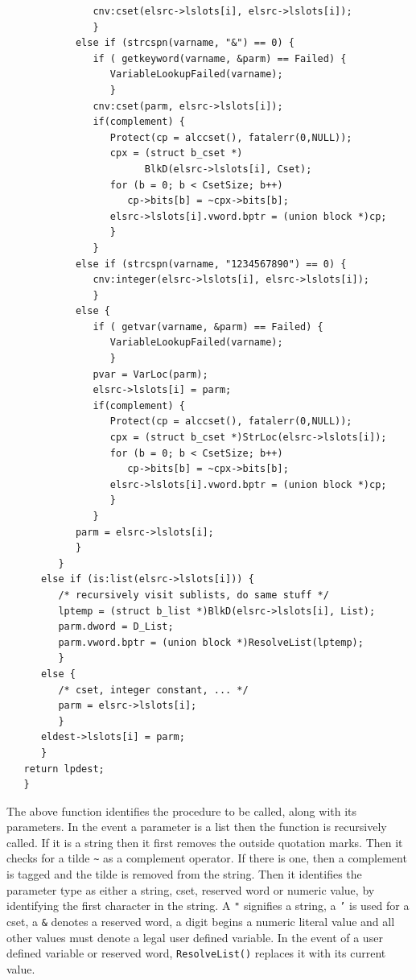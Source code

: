 \documentclass{article}
\begin{document}
\begin{verbatim}
               cnv:cset(elsrc->lslots[i], elsrc->lslots[i]);
               }
            else if (strcspn(varname, "&") == 0) {
               if ( getkeyword(varname, &parm) == Failed) {
                  VariableLookupFailed(varname);
                  }
               cnv:cset(parm, elsrc->lslots[i]);
               if(complement) {
                  Protect(cp = alccset(), fatalerr(0,NULL));
                  cpx = (struct b_cset *)
                        BlkD(elsrc->lslots[i], Cset);
                  for (b = 0; b < CsetSize; b++) 
                     cp->bits[b] = ~cpx->bits[b];
                  elsrc->lslots[i].vword.bptr = (union block *)cp;
                  }
               }
            else if (strcspn(varname, "1234567890") == 0) {
               cnv:integer(elsrc->lslots[i], elsrc->lslots[i]);
               }
            else {
               if ( getvar(varname, &parm) == Failed) {
                  VariableLookupFailed(varname);
                  }
               pvar = VarLoc(parm);
               elsrc->lslots[i] = parm;
               if(complement) {
                  Protect(cp = alccset(), fatalerr(0,NULL));
                  cpx = (struct b_cset *)StrLoc(elsrc->lslots[i]);
                  for (b = 0; b < CsetSize; b++) 
                     cp->bits[b] = ~cpx->bits[b];
                  elsrc->lslots[i].vword.bptr = (union block *)cp;
                  }
               }
            parm = elsrc->lslots[i];
            }
         }
      else if (is:list(elsrc->lslots[i])) {
         /* recursively visit sublists, do same stuff */
         lptemp = (struct b_list *)BlkD(elsrc->lslots[i], List);
         parm.dword = D_List;
         parm.vword.bptr = (union block *)ResolveList(lptemp);
         }
      else { 
         /* cset, integer constant, ... */
         parm = elsrc->lslots[i];
         }
      eldest->lslots[i] = parm;
      }
   return lpdest;
   }
\end{verbatim}
The above function identifies the procedure to be called, along with its parameters.  In the event a parameter is a list then the function is recursively called.  If it is a string then it first removes the outside quotation marks.  Then it checks for a tilde \texttt{\~} as a complement operator.  If there is one, then a complement is tagged and the tilde is removed from the string.  Then it identifies the parameter type as either a string, cset, reserved word or numeric value, by identifying the first character in the string.  A \texttt{"} signifies a string, a \texttt{'} is used for a cset, a \texttt{\&} denotes a reserved word, a digit begins a numeric literal value and all other values must denote a legal user defined variable.  In the event of a user defined variable or reserved word, \texttt{ResolveList()} replaces it with its current value.
\end{document}
